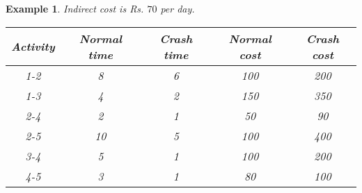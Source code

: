 \documentclass[oneside,11pt,pdftex]{book}%
\numberwithin{equation}{section}
\newtheorem{example}[theorem]{Example}
\numberwithin{section}{chapter}
\numberwithin{equation}{chapter}
\begin{document}
\begin{example}
	Indirect cost is Rs. $ 70 $ per day.
	\begin{table}[!htp]
		\centering
		\begin{tabular}{@{}ccccc@{}}
			\toprule
			Activity & Normal time & Crash time & Normal cost & Crash cost \\ \midrule
			1-2 & 8 & 6 & 100 & 200 \\
			1-3 & 4 & 2 & 150 & 350 \\
			2-4 & 2 & 1 & 50 & 90 \\
			2-5 & 10 & 5 & 100 & 400 \\
			3-4 & 5 & 1 & 100 & 200 \\
			4-5 & 3 & 1 & 80 & 100 \\ \bottomrule
		\end{tabular}
	\end{table}

\end{example}
\end{document}
